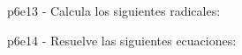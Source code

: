 \documentclass[spanish, 11pt]{exam}
\begin{document}
\begin{questions}
\begin{multicols}{3}
\begin{parts}
        \end{parts}
        \end{multicols}
        \question p6e13 - Calcula los siguientes radicales:
        \begin{multicols}{3} 
        \end{multicols}
        \question p6e14 - Resuelve las siguientes ecuaciones:
        \begin{multicols}{3} 

\end{multicols}
\end{questions}
\end{document}
